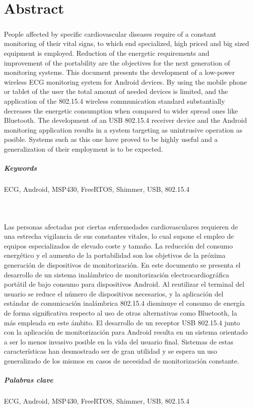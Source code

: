 \chapter{Abstract}
\label{cha:abstract}

	{\small 
	\paragraph{} People affected by specific cardiovascular diseases require of a constant monitoring of their vital signs, to which end specialized, high priced and big sized equipment is employed. Reduction of the energetic requirements and improvement of the portability are the objectives for the next generation of monitoring systems. This document presents the development of a low-power wireless ECG monitoring system for Android devices. By using the mobile phone or tablet of the user the total amount of needed devices is limited, and the application of the 802.15.4 wireless communication standard substantially decreases the energetic consumption when compared to wider spread ones like Bluetooth. The development of an USB 802.15.4 receiver device and the Android monitoring application results in a system targeting as unintrusive operation as posible. Systems such as this one have proved to be highly useful and a generalization of their employment is to be expected.
	\paragraph{Keywords}	
	ECG, Android, MSP430, FreeRTOS, Shimmer, USB, 802.15.4
	}\\
	
	{\small 
	\paragraph{} Las personas afectadas por ciertas enfermedades cardiovasculares requieren de una estrecha vigilancia de sus constantes vitales, lo cual supone el empleo de equipos especializados de elevado coste y tamaño. La reducción del consumo energético y el aumento de la portabilidad son los objetivos de la próxima generación de dispositivos de monitorización. En este documento se presenta el desarrollo de un sistema inalámbrico de monitorización electrocardiográfica portátil de bajo consumo para dispositivos Android. Al reutilizar el terminal del usuario se reduce el número de dispositivos necesarios, y la aplicación del estándar de comunicación inalámbrica 802.15.4 disminuye el consumo de energía de forma significativa respecto al uso de otras alternativas como Bluetooth, la más empleada en este ámbito. El desarrollo de un receptor USB 802.15.4 junto con la aplicación de monitorización para Android resulta en un sistema orientado a ser lo menos invasivo posible en la vida del usuario final. Sistemas de estas características han desmostrado ser de gran utilidad y se espera un uso generalizado de los mismos en casos de necesidad de monitorización constante.
	\paragraph{Palabras clave}
	ECG, Android, MSP430, FreeRTOS, Shimmer, USB, 802.15.4
	}



